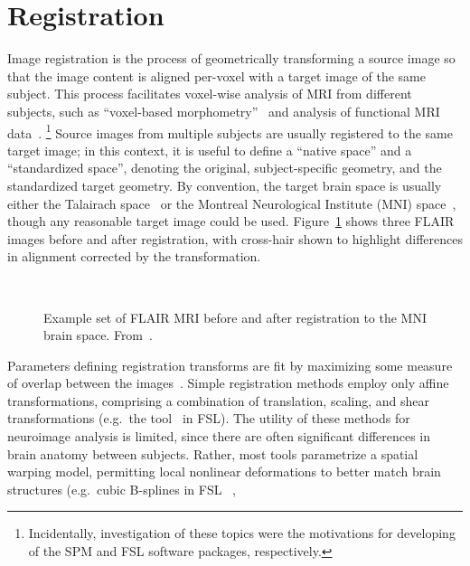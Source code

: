 \section{Registration}\label{s:pre-reg}
Image registration is the process of geometrically transforming a source image
so that the image content is aligned per-voxel with a target image of the same subject.
This process facilitates voxel-wise analysis of MRI from different subjects,
such as  ``voxel-based morphometry''~\cite{Ashburner2000a}
and analysis of functional MRI data~\cite{Smith2004}.%
\footnote{Incidentally, investigation of these topics were the motivations
  for developing of the SPM and FSL software packages, respectively.}
Source images from multiple subjects are usually registered to the same target image;
in this context, it is useful to define a ``native space'' and a ``standardized space'',
denoting the original, subject-specific geometry, and the standardized target geometry.
By convention, the target brain space is usually either
the Talairach space~\cite{Talairach1988} or
the Montreal Neurological Institute (MNI) space~\cite{Evans1993},
though any reasonable target image could be used.
Figure~\ref{fig:pre-registration} shows three FLAIR images before and after registration,
with cross-hair shown to highlight differences in alignment corrected by the transformation.
\par
\begin{figure}
  \centering
  \\[0.5em]
  \caption{Example set of FLAIR MRI before and after registration to the MNI brain space.
    From~\cite{WMHSEG2017}.}%
  \label{fig:pre-registration}
\end{figure}
Parameters defining registration transforms are fit by
maximizing some measure of overlap between the images~\cite{Sotiras2013}.
Simple registration methods employ only affine transformations,
comprising a combination of translation, scaling, and shear transformations
(e.g.\ the  tool~\cite{Jenkinson2002} in FSL).
The utility of these methods for neuroimage analysis is limited,
since there are often significant differences in brain anatomy between subjects.
Rather, most tools parametrize a spatial warping model,
permitting local nonlinear deformations to better match brain structures (e.g.\
cubic B-splines in FSL ~\cite{Andersson2007},
